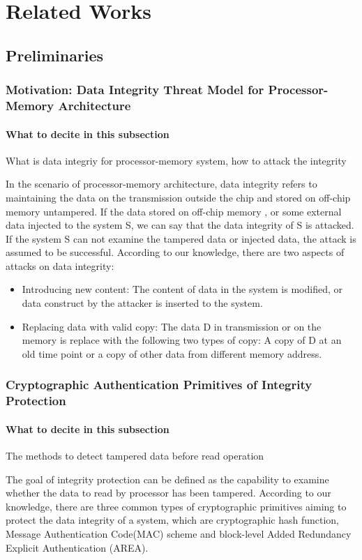 \documentclass{article}
\begin{document}
\section{Related Works} 
\subsection{Preliminaries}
\subsubsection{Motivation: Data Integrity Threat Model for Processor-Memory Architecture}
\paragraph{What to decite in this subsection}
What is data integriy for processor-memory system, how to attack the integrity

In the scenario of processor-memory architecture, data integrity refers to maintaining the data on the transmission outside the chip and stored on off-chip memory untampered. If the data stored on off-chip memory , or some external data injected to the system S, we can say that the data integrity of S is attacked. If the system S can not examine the tampered data or injected data, the attack is assumed to be successful. According to our knowledge, there are two aspects of attacks on data integrity:
\begin{itemize}
	\item Introducing new content: The content of data in the system is modified, or data construct by the attacker is inserted to the system.
	\item Replacing data with valid copy: The data D in transmission or on the memory is replace with the following two types of copy: A copy of D at an old time point or a copy of other data from different memory address.
\end{itemize}

\subsubsection{Cryptographic Authentication Primitives of Integrity Protection}
\paragraph{What to decite in this subsection}
The methods to detect tampered data before read operation

The goal of integrity protection can be defined as the capability to examine whether the data to read by processor has been tampered. According to our knowledge, there are three common types of cryptographic primitives aiming to protect the data integrity of a system, which are cryptographic hash function, Message Authentication Code(MAC) scheme and block-level Added Redundancy Explicit Authentication (AREA).
\end{document}
